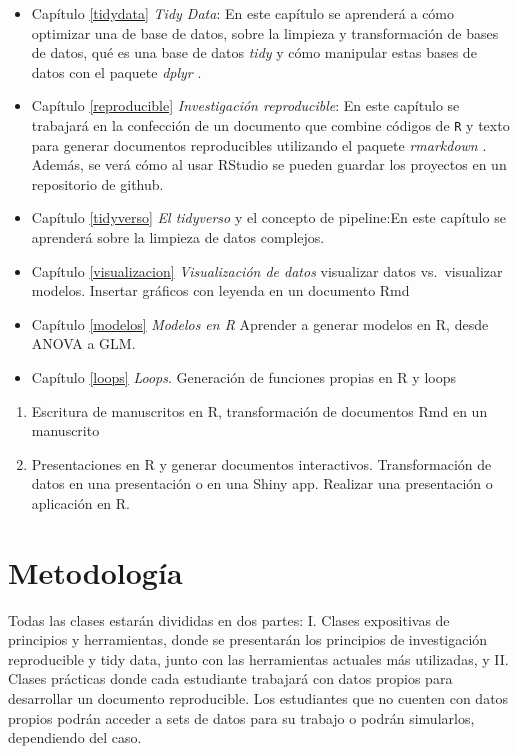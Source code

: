 \documentclass[]{book}
\begin{document}
\begin{itemize}
\item
  Capítulo \ref{tidydata} \emph{Tidy Data}: En este capítulo se
  aprenderá a cómo optimizar una de base de datos, sobre la limpieza y
  transformación de bases de datos, qué es una base de datos \emph{tidy}
  y cómo manipular estas bases de datos con el paquete \emph{dplyr}
  \citep{R-dplyr}.
\item
  Capítulo \ref{reproducible} \emph{Investigación reproducible}: En este
  capítulo se trabajará en la confección de un documento que combine
  códigos de \texttt{R} y texto para generar documentos reproducibles
  utilizando el paquete \emph{rmarkdown} \citep{Allaire2018}. Además, se
  verá cómo al usar RStudio se pueden guardar los proyectos en un
  repositorio de github.
\item
  Capítulo \ref{tidyverso} \emph{El tidyverso} y el concepto de
  pipeline:En este capítulo se aprenderá sobre la limpieza de datos
  complejos.
\item
  Capítulo \ref{visualizacion} \emph{Visualización de datos} visualizar
  datos vs.~visualizar modelos. Insertar gráficos con leyenda en un
  documento Rmd
\item
  Capítulo \ref{modelos} \emph{Modelos en R} Aprender a generar modelos
  en R, desde ANOVA a GLM.
\item
  Capítulo \ref{loops} \emph{Loops}. Generación de funciones propias en
  R y loops
\end{itemize}

\begin{enumerate}
\def\labelenumi{\arabic{enumi}.}
\setcounter{enumi}{5}
\item
  Escritura de manuscritos en R, transformación de documentos Rmd en un
  manuscrito
\item
  Presentaciones en R y generar documentos interactivos. Transformación
  de datos en una presentación o en una Shiny app. Realizar una
  presentación o aplicación en R.
\end{enumerate}

\hypertarget{metodologia}{%
\section{Metodología}\label{metodologia}}

Todas las clases estarán divididas en dos partes: I. Clases expositivas
de principios y herramientas, donde se presentarán los principios de
investigación reproducible y tidy data, junto con las herramientas
actuales más utilizadas, y II. Clases prácticas donde cada estudiante
trabajará con datos propios para desarrollar un documento reproducible.
Los estudiantes que no cuenten con datos propios podrán acceder a sets
de datos para su trabajo o podrán simularlos, dependiendo del caso.
\end{document}
